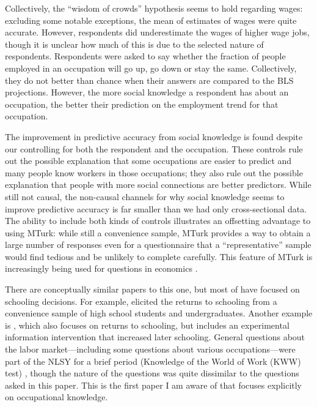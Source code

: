 \documentclass[12pt]{article}
\begin{document}
Collectively, the ``wisdom of crowds'' hypothesis seems to hold regarding wages: 
excluding some notable exceptions, the mean of estimates of wages were quite accurate. 
However, respondents did underestimate the wages of higher wage jobs, though it is unclear how much of this is due to the selected nature of respondents. 
Respondents were asked to say whether the fraction of people employed in an occupation will go up, go down or stay the same. 
Collectively, they do not better than chance when their answers are compared to the BLS projections. 
However, the more social knowledge a respondent has about an occupation, the better their prediction on the employment trend for that occupation. 

The improvement in predictive accuracy from social knowledge is found despite our controlling for both the respondent and the occupation.
These controls rule out the possible explanation that some occupations are easier to predict and many people know workers in those occupations; 
they also rule out the possible explanation that people with more social connections are better predictors.
While still not causal, the non-causal channels for why social knowledge seems to improve predictive accuracy is far smaller than we had only cross-sectional data. 
The ability to include both kinds of controls illustrates an offsetting advantage to using MTurk: 
while still a convenience sample, MTurk provides a way to obtain a large number of responses even for a questionnaire that a ``representative'' sample would find tedious and be unlikely to complete carefully.
This feature of MTurk is increasingly being used for questions in economics  \citep{kuziemko2013elastic, saez2013generalized}. 

There are conceptually similar papers to this one, but most of have focused on schooling decisions.  
For example, \cite{dominitz1996} elicited the returns to schooling from a convenience sample of high school students and undergraduates. 
Another example is \cite{jensen2010perceived}, which also focuses on returns to schooling, but includes an experimental information intervention that increased later schooling.  
General questions about the labor market---including some questions about various occupations---were part of the NLSY for a brief period (Knowledge of the World of Work (KWW) test) \citep{kohen1975}, though the nature of the questions was quite dissimilar to the questions asked in this paper. 
This is the first paper I am aware of that focuses explicitly on occupational knowledge.
\end{document}
